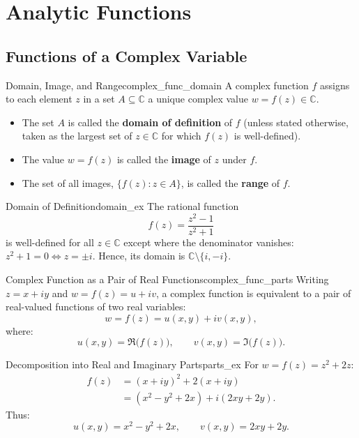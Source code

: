 \chapter{Analytic Functions}

\section{Functions of a Complex Variable}

\begin{definition}{Domain, Image, and Range}{complex_func_domain}
A complex function $f$ assigns to each element $z$ in a set $A \subseteq \mathbb{C}$ a unique complex value $w = f(z) \in \mathbb{C}$.
\begin{itemize}
    \item The set $A$ is called the \textbf{domain of definition} of $f$ (unless stated otherwise, taken as the largest set of $z \in \mathbb{C}$ for which $f(z)$ is well-defined).
    \item The value $w = f(z)$ is called the \textbf{image} of $z$ under $f$.
    \item The set of all images, $\{f(z) : z \in A\}$, is called the \textbf{range} of $f$.
\end{itemize}
\end{definition}

\begin{example}{Domain of Definition}{domain_ex}
The rational function
\begin{equation}
f(z) = \frac{z^2 - 1}{z^2 + 1}
\end{equation}
is well-defined for all $z \in \mathbb{C}$ except where the denominator vanishes: $z^2 + 1 = 0 \iff z = \pm i$. Hence, its domain is $\mathbb{C} \setminus \{i, -i\}$.
\end{example}

\begin{definition}{Complex Function as a Pair of Real Functions}{complex_func_parts}
Writing $z = x + iy$ and $w = f(z) = u + iv$, a complex function is equivalent to a pair of real-valued functions of two real variables:
\begin{equation}
w = f(z) = u(x, y) + i v(x, y),
\end{equation}
where:
\begin{equation}
u(x, y) = \Re\big(f(z)\big), \qquad v(x, y) = \Im\big(f(z)\big).
\end{equation}
\end{definition}

\begin{example}{Decomposition into Real and Imaginary Parts}{parts_ex}
For $w = f(z) = z^2 + 2z$:
\begin{align}
f(z) &= (x + iy)^2 + 2(x + iy) \nonumber \\
     &= (x^2 - y^2 + 2x) + i(2xy + 2y).
\end{align}
Thus:
\begin{equation}
u(x, y) = x^2 - y^2 + 2x, \qquad v(x, y) = 2xy + 2y.
\end{equation}
\end{example}

